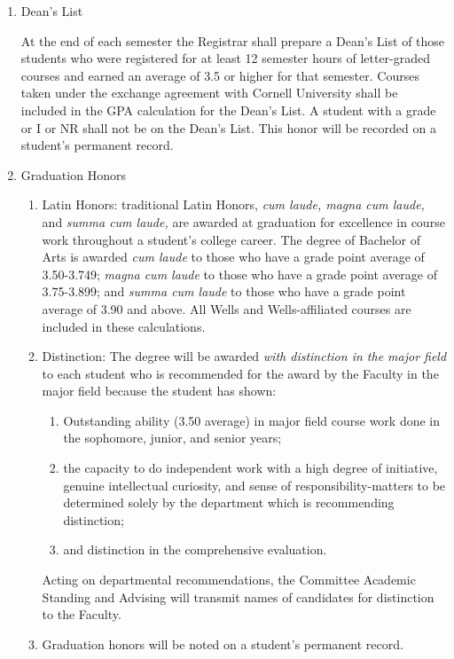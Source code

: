 \documentclass{manual}
\newcommand{\modified}[1]{}
\newcommand{\oldbreak}[1]{}
\newcommand{\itemLevelA}{\alph*.}
\newcommand{\itemLevelB}{\arabic*)}
\newcommand{\itemRefA}{\alph*}
\newcommand{\itemRefB}{\arabic*}
\begin{document}
\begin{enumerate}[label=\itemLevelA,ref=\itemRefA]

\item Dean's List

At the end of each semester the Registrar shall prepare a Dean's List of those students who were registered for at least 12 semester hours of letter-graded courses and earned an average of 3.5 or higher for that semester. Courses taken under the exchange agreement with Cornell University shall be included in the GPA calculation for the Dean's List. A student with a grade or I or NR shall not be on the Dean's List. This honor will be recorded on a student's permanent record.

\item Graduation Honors  \modified{5/13/97}

\begin{enumerate}[label=\itemLevelB,ref=\itemRefB]

\item Latin Honors: traditional Latin Honors, \textit{cum laude, magna cum laude, }and \textit{summa cum laude, }are awarded at graduation for excellence in course work throughout a student's college career. The degree of Bachelor of Arts is awarded \textit{cum laude }to those who have a grade point average of 3.50-3.749; \textit{magna cum laude }to those who have a grade point average of 3.75-3.899; and \textit{summa cum laude }to those who have a grade point average of 3.90 and above. All Wells and Wells-affiliated courses are included in these calculations.



\oldbreak{VII-1}

\item Distinction: The degree will be awarded \textit{with distinction in the major field }to each student who is recommended for the award by the Faculty in the major field because the student has shown:

\begin{enumerate}[label=\alph*)]

\item Outstanding ability (3.50 average) in major field course work done in the sophomore, junior, and senior years;

\item the capacity to do independent work with a high degree of initiative, genuine intellectual curiosity, and sense of responsibility-matters to be determined solely by the department which is recommending distinction;

\item and distinction in the comprehensive evaluation.
\end{enumerate}

Acting on departmental recommendations, the Committee Academic Standing and Advising will transmit names of candidates for distinction to the Faculty.

\item Graduation honors will be noted on a student's permanent record.
\end{enumerate}

\end{enumerate}
\end{document}
